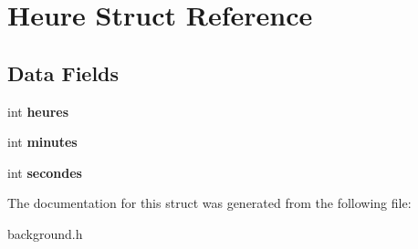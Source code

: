 \hypertarget{structHeure}{}\section{Heure Struct Reference}
\label{structHeure}
\subsection*{Data Fields}
\begin{DoxyCompactItemize}
\item 
\mbox{\label{structHeure_ae49d0f4a02685669f717f1617b564a57}} 
int {\bfseries heures}
\item 
\mbox{\label{structHeure_add82a2eaf354bbe3872ca4387f222295}} 
int {\bfseries minutes}
\item 
\mbox{\label{structHeure_ad0d5caf9f781db4389b8514d5ecffbd3}} 
int {\bfseries secondes}
\end{DoxyCompactItemize}


The documentation for this struct was generated from the following file\+:\begin{DoxyCompactItemize}
\item 
background.\+h\end{DoxyCompactItemize}
